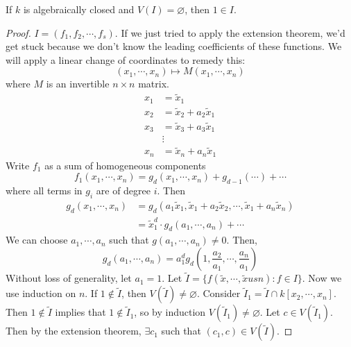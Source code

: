 \documentclass[a4paper,twoside,master.tex]{subfiles}
\begin{document}
\begin{theorem}
    If $ k $ is algebraically closed and $ V(I) = \varnothing $, then $ 1 \in I $.
\end{theorem}
\begin{proof}
    $ I = (f_1, f_2, \cdots, f_s) $. If we just tried to apply the extension theorem, we'd get stuck because we don't know the leading coefficients of these functions. We will apply a linear change of coordinates to remedy this:
    \begin{equation}
        (x_1, \cdots, x_n) \mapsto M(x_1, \cdots, x_n)
    \end{equation}
    where $ M $ is an invertible $ n \times n $ matrix.
    \begin{align}
        x_1 &= \tilde{x}_1\\
        x_2 &= \tilde{x}_2 + a_2 \tilde{x}_1\\
        x_3 &= \tilde{x}_3 + a_3 \tilde{x}_1 \\
        &\vdots\\
        x_n &= \tilde{x}_n + a_n \tilde{x}_1
    \end{align}
    Write $ f_1 $ as a sum of homogeneous components
    \begin{equation}
        f_1(x_1, \cdots, x_n) = g_d(x_1, \cdots, x_n) + g_{d-1}(\cdots) + \cdots
    \end{equation}
    where all terms in $ g_i $ are of degree $ i $. Then
    \begin{align}
        g_d(x_1, \cdots, x_n) &= g_d(a_1 \tilde{x}_1, \tilde{x}_1 + a_2 \tilde{x}_2, \cdots, \tilde{x}_1 + a_n \tilde{x}_n) \\
                              &= \tilde{x}_1^d \cdot g_d(a_1, \cdots, a_n) + \cdots
    \end{align}
    We can choose $ a_1, \cdots, a_n $ such that $ g(a_1, \cdots, a_n) \neq 0 $. Then,
    \begin{equation}
        g_d(a_1, \cdots, a_n) = a_1^d g_d\left( 1, \frac{a_2}{a_1}, \cdots, \frac{a_n}{a_1} \right)
    \end{equation}
    Without loss of generality, let $ a_1 = 1 $. Let $ \tilde{I} = \{f(\tilde{x}, \cdots, \tilde{x} us n) \colon f \in I\} $. Now we use induction on $ n $. If $ 1 \not\in \tilde{I} $, then $ V(\tilde{I}) \neq \varnothing $. Consider $ \tilde{I}_1 = \tilde{I} \cap k[x_2, \cdots, x_n] $. Then $ 1 \not\in \tilde{I} $ implies that $ 1 \not\in \tilde{I}_1 $, so by induction $ V(\tilde{I}_1) \neq \varnothing $. Let $ c \in V(\tilde{I}_1) $. Then by the extension theorem, $ \exists c_1 $ such that $ (c_1, c) \in V(\tilde{I}) $.
\end{proof}
\end{document}
